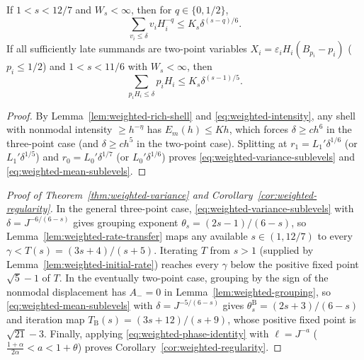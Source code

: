 \begin{lemma}\label{lem:weighted-sublevels}
If $1<s<12/7$ and $W_s<\infty$, then for $q\in\{0,1/2\}$,
\begin{equation}\label{eq:weighted-variance-sublevels}
             \sum_{v_i\le\delta}v_iH_i^{-q}
                              \le K_s\delta^{(s-q)/6}.
\end{equation}
If all sufficiently late summands are two-point variables
$X_i=\varepsilon_iH_i(B_{p_i}-p_i)$ ($p_i\le1/2$) and $1<s<11/6$ with
$W_s<\infty$, then
\begin{equation}\label{eq:weighted-mean-sublevels}
             \sum_{p_iH_i\le\delta}p_iH_i
                              \le K_s\delta^{(s-1)/5}.
\end{equation}
\end{lemma}
\begin{proof}
By Lemma~\ref{lem:weighted-rich-shell} and \eqref{eq:weighted-intensity}, any
shell with nonmodal intensity $\ge h^{-\eta}$ has $E_m(h)\le Kh$, which
forces $\delta\ge ch^6$ in the three-point case (and $\delta\ge ch^5$ in the
two-point case). Splitting at $r_1=L_1'\delta^{1/6}$ (or $L_1'\delta^{1/5}$)
and $r_0=L_0'\delta^{1/7}$ (or $L_0'\delta^{1/6}$) proves
\eqref{eq:weighted-variance-sublevels} and \eqref{eq:weighted-mean-sublevels}.
\end{proof}

\begin{proof}[Proof of Theorem~\ref{thm:weighted-variance} and Corollary~\ref{cor:weighted-regularity}]
In the general three-point case, \eqref{eq:weighted-variance-sublevels} with
$\delta=J^{-6/(6-s)}$ gives grouping exponent $\theta_s=(2s-1)/(6-s)$, so
Lemma~\ref{lem:weighted-rate-transfer} maps any available $s\in(1,12/7)$ to
every $\gamma<T(s)=(3s+4)/(s+5)$. Iterating $T$ from $s>1$ (supplied by
Lemma~\ref{lem:weighted-initial-rate}) reaches every $\gamma$ below the positive
fixed point $\sqrt5-1$ of $T$. In the eventually two-point case, grouping by
the sign of the nonmodal displacement has $A_-=0$ in Lemma~\ref{lem:weighted-grouping},
so \eqref{eq:weighted-mean-sublevels} with $\delta=J^{-5/(6-s)}$ gives
$\theta_s^{\mathrm B}=(2s+3)/(6-s)$ and iteration map
$T_{\mathrm B}(s)=(3s+12)/(s+9)$, whose positive fixed point is
$\sqrt{21}-3$. Finally, applying \eqref{eq:weighted-phase-identity} with
$\ell=J^{-a}$ ($\frac{1+\alpha}{2\alpha}<a<1+\theta$) proves
Corollary~\ref{cor:weighted-regularity}.
\end{proof}
